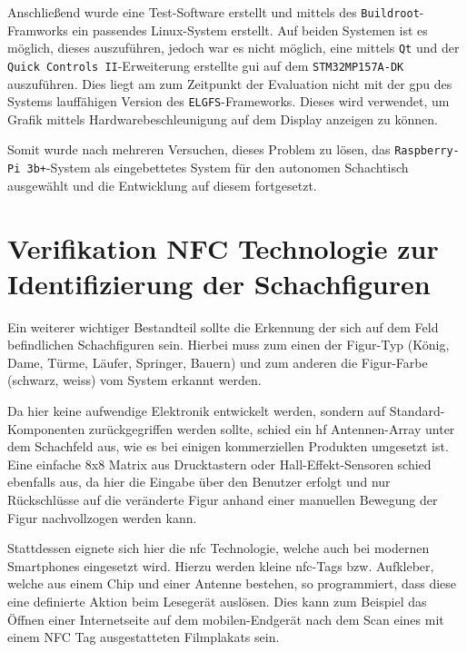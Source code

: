 Anschließend wurde eine Test-Software erstellt und mittels des
\passthrough{\lstinline!Buildroot!}-Framworks ein passendes Linux-System
erstellt. Auf beiden Systemen ist es möglich, dieses auszuführen, jedoch
war es nicht möglich, eine mittels \passthrough{\lstinline!Qt!} und der
\passthrough{\lstinline!Quick Controls II!}-Erweiterung erstellte
\gls{gui} auf dem \passthrough{\lstinline!STM32MP157A-DK!} auszuführen.
Dies liegt am zum Zeitpunkt der Evaluation nicht mit der \gls{gpu} des
Systems lauffähigen Version des
\passthrough{\lstinline!ELGFS!}-Frameworks. Dieses wird verwendet, um
Grafik mittels Hardwarebeschleunigung auf dem Display anzeigen zu
können.

Somit wurde nach mehreren Versuchen, dieses Problem zu lösen, das
\passthrough{\lstinline!Raspberry-Pi 3b+!}-System als eingebettetes
System für den autonomen Schachtisch ausgewählt und die Entwicklung auf
diesem fortgesetzt.

\hypertarget{verifikation-nfc-technologie-zur-identifizierung-der-schachfiguren}{%
\section{Verifikation NFC Technologie zur Identifizierung der
Schachfiguren}\label{verifikation-nfc-technologie-zur-identifizierung-der-schachfiguren}}

Ein weiterer wichtiger Bestandteil sollte die Erkennung der sich auf dem
Feld befindlichen Schachfiguren sein. Hierbei muss zum einen der
Figur-Typ (König, Dame, Türme, Läufer, Springer, Bauern) und zum anderen
die Figur-Farbe (schwarz, weiss) vom System erkannt werden.

Da hier keine aufwendige Elektronik entwickelt werden, sondern auf
Standard-Komponenten zurückgegriffen werden sollte, schied ein \gls{hf}
Antennen-Array unter dem Schachfeld aus, wie es bei einigen
kommerziellen Produkten umgesetzt ist. Eine einfache 8x8 Matrix aus
Drucktastern oder Hall-Effekt-Sensoren schied ebenfalls aus, da hier die
Eingabe über den Benutzer erfolgt und nur Rückschlüsse auf die
veränderte Figur anhand einer manuellen Bewegung der Figur nachvollzogen
werden kann.

Stattdessen eignete sich hier die \gls{nfc} Technologie, welche auch bei
modernen Smartphones eingesetzt wird. Hierzu werden kleine
\gls{nfc}-Tags bzw. Aufkleber, welche aus einem Chip und einer Antenne
bestehen, so programmiert, dass diese eine definierte Aktion beim
Lesegerät auslösen. Dies kann zum Beispiel das Öffnen einer
Internetseite auf dem mobilen-Endgerät nach dem Scan eines mit einem NFC
Tag ausgestatteten Filmplakats sein.

